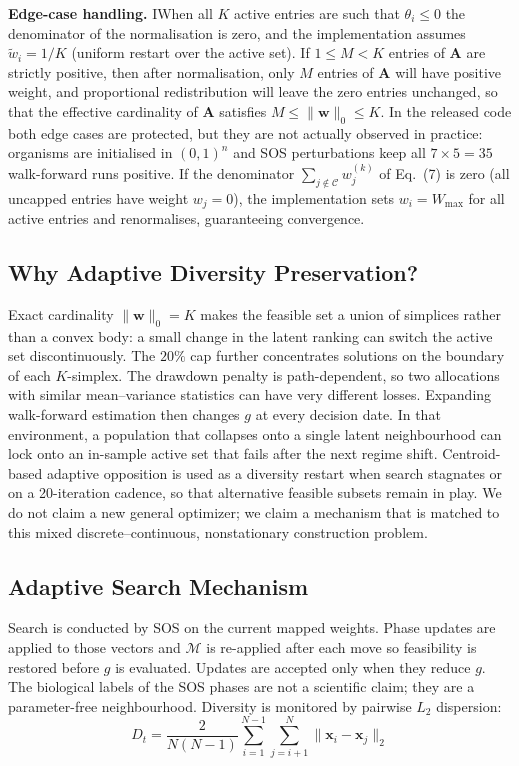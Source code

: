\documentclass[11pt,a4paper]{article}
\begin{document}
\noindent\textbf{Edge-case handling.}
IWhen all $K$ active entries are such that $\theta_i \le 0$ the denominator of the normalisation is zero, and the implementation assumes $\tilde{w}_i = 1/K$ (uniform restart over the active set). If $1 \le M < K$ entries of $\mathbf{A}$ are strictly positive, then after normalisation, only $M$ entries of $\mathbf{A}$ will have positive weight, and proportional redistribution will leave the zero entries unchanged, so that the effective cardinality of $\mathbf{A}$ satisfies $M \le \|\mathbf{w}\|_0 \le K$. In the released code both edge cases are protected, but they are not actually observed in practice: organisms are initialised in $(0,1)^n$ and SOS perturbations keep all $7 \times 5 = 35$ walk-forward runs positive. If the denominator $\sum_{j \notin \mathcal{C}} w_j^{(k)}$ of Eq.~(7) is zero (all uncapped entries have weight $w_j = 0$), the implementation sets $w_i = W_{\max}$ for all active entries and renormalises, guaranteeing convergence.

\subsection{Why Adaptive Diversity Preservation?}
Exact cardinality $\|\mathbf{w}\|_0=K$ makes the feasible set a union of simplices rather than a convex body: a small change in the latent ranking can switch the active set discontinuously. The $20\%$ cap further concentrates solutions on the boundary of each $K$-simplex. The drawdown penalty is path-dependent, so two allocations with similar mean--variance statistics can have very different losses. Expanding walk-forward estimation then changes $g$ at every decision date. In that environment, a population that collapses onto a single latent neighbourhood can lock onto an in-sample active set that fails after the next regime shift. Centroid-based adaptive opposition is used as a diversity restart when search stagnates or on a 20-iteration cadence, so that alternative feasible subsets remain in play. We do not claim a new general optimizer; we claim a mechanism that is matched to this mixed discrete--continuous, nonstationary construction problem.

\subsection{Adaptive Search Mechanism}
Search is conducted by SOS \cite{cheng2014} on the current mapped weights. Phase updates are applied to those vectors and $\mathcal{M}$ is re-applied after each move so feasibility is restored before $g$ is evaluated. Updates are accepted only when they reduce $g$. The biological labels of the SOS phases are not a scientific claim; they are a parameter-free neighbourhood. Diversity is monitored by pairwise $L_2$ dispersion:
\begin{equation}
D_t = \frac{2}{N(N-1)} \sum_{i=1}^{N-1} \sum_{j=i+1}^N \|\mathbf{x}_i - \mathbf{x}_j\|_2
\end{equation}
\end{document}
